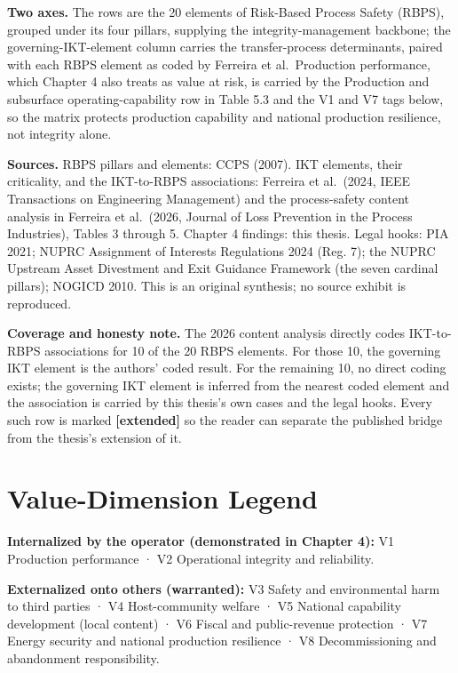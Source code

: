 \documentclass[twoside,fontset=lmodern]{mitthesis}
\begin{document}
\textbf{Two axes.} The rows are the 20 elements of Risk-Based Process
Safety (RBPS), grouped under its four pillars, supplying the
integrity-management backbone; the governing-IKT-element column carries
the transfer-process determinants, paired with each RBPS element as
coded by Ferreira et al.~Production performance, which Chapter 4 also
treats as value at risk, is carried by the Production and subsurface
operating-capability row in Table 5.3 and the V1 and V7 tags below, so
the matrix protects production capability and national production
resilience, not integrity alone.

\textbf{Sources.} RBPS pillars and elements: CCPS (2007). IKT elements,
their criticality, and the IKT-to-RBPS associations: Ferreira et
al.~(2024, IEEE Transactions on Engineering Management) and the
process-safety content analysis in Ferreira et al.~(2026, Journal of
Loss Prevention in the Process Industries), Tables 3 through 5. Chapter
4 findings: this thesis. Legal hooks: PIA 2021; NUPRC Assignment of
Interests Regulations 2024 (Reg. 7); the NUPRC Upstream Asset Divestment
and Exit Guidance Framework (the seven cardinal pillars); NOGICD 2010.
This is an original synthesis; no source exhibit is reproduced.

\textbf{Coverage and honesty note.} The 2026 content analysis directly
codes IKT-to-RBPS associations for 10 of the 20 RBPS elements. For those
10, the governing IKT element is the authors' coded result. For the
remaining 10, no direct coding exists; the governing IKT element is
inferred from the nearest coded element and the association is carried
by this thesis's own cases and the legal hooks. Every such row is marked
\textbf{{[}extended{]}} so the reader can separate the published bridge
from the thesis's extension of it.

\hypertarget{value-dimension-legend}{%
\section{Value-Dimension Legend}\label{value-dimension-legend}}

\textbf{Internalized by the operator (demonstrated in Chapter 4):} V1
Production performance · V2 Operational integrity and reliability.

\textbf{Externalized onto others (warranted):} V3 Safety and
environmental harm to third parties · V4 Host-community welfare · V5
National capability development (local content) · V6 Fiscal and
public-revenue protection · V7 Energy security and national production
resilience · V8 Decommissioning and abandonment responsibility.
\end{document}
